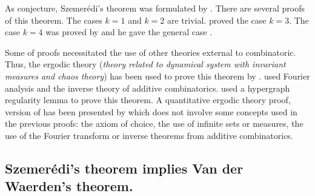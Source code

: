 As conjecture, Szemerédi's theorem was formulated by \cite{JLMS}. There are several proofs of this theorem. The cases $k=1$ and $k=2$ are trivial. \cite{roth1953certain, roth1970irregularities} proved the case $k=3.$ The case $k=4$ was proved by \cite{szemeredi1969sets} and he gave the general case \citep{szemeredi1975sets}.

Some of proofs necessitated the use of other theories external to combinatoric. Thus, the ergodic theory (\textit{theory related to dynamical system with invariant measures and chaos theory})  has been used to prove this theorem by \cite{furstenberg1977ergodic, furstenberg1982ergodic}. \cite{gowers1998fourier, gowers2001new}  used Fourier analysis and the inverse theory of additive  combinatorics. \cite{gowers2007hypergraph} used a hypergraph regularity lemma to prove this theorem. A  quantitative ergodic theory proof, version of \cite{furstenberg1982ergodic} has been presented  by \cite{tao2006quantitative} which does not involve some concepts used in the previous proofs: the axiom of choice, the use of infinite sets or measures, the use of the Fourier transform or inverse theorems from additive combinatorics.

\subsection{Szemerédi's theorem implies Van der Waerden's theorem.} \label{vsz}

